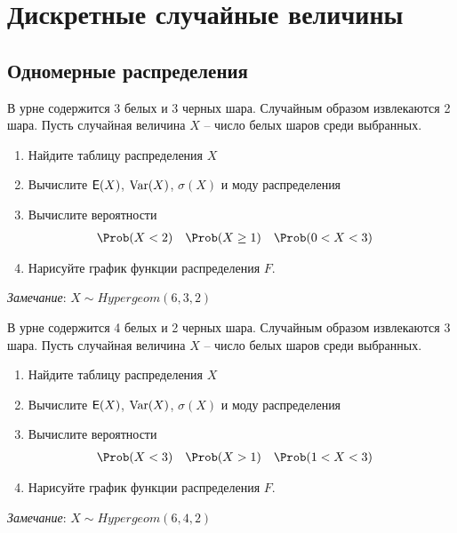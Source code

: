 

\section{Дискретные случайные величины}

\subsection{Одномерные распределения}

\begin{exercise}
В урне содержится 3 белых и 3 черных шара. Случайным образом извлекаются
2 шара. Пусть случайная величина \(X\) -- число белых шаров среди выбранных.
\begin{enumerate}
	\item Найдите таблицу распределения \(X\)
	\item Вычислите \({\mathsf E}(X)\), \(\operatorname{Var}(X)\), \(\sigma(X)\) и моду распределения
	\item Вычислите вероятности
	\begin{align*}
		&\Prob(X<2) & &\Prob(X\geq1) & &\Prob(0<X<3)
	\end{align*}
	\item Нарисуйте график функции распределения \(F\).
\end{enumerate}
\textit{Замечание}: \(X\sim Hypergeom(6,3,2)\)
\end{exercise}

\begin{exercise}
В урне содержится 4 белых и 2 черных шара. Случайным образом извлекаются
3 шара. Пусть случайная величина \(X\) -- число белых шаров среди выбранных.
\begin{enumerate}
	\item Найдите таблицу распределения \(X\)
	\item Вычислите \({\mathsf E}(X)\), \(\operatorname{Var}(X)\), \(\sigma(X)\) и моду распределения
	\item Вычислите вероятности
	\begin{align*}
		&\Prob(X<3) & &\Prob(X>1) & &\Prob(1<X<3)
	\end{align*}
	\item Нарисуйте график функции распределения \(F\).
\end{enumerate}
\textit{Замечание}: \(X\sim Hypergeom(6,4,2)\)
\end{exercise}

